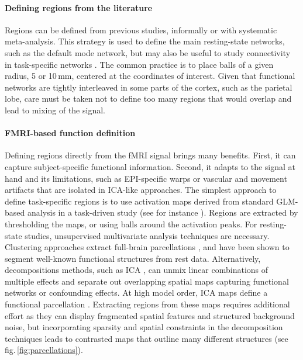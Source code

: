 \documentclass[5p]{elsarticle}
\begin{document}
\paragraph{Defining regions from the literature}
%
Regions can be defined from previous studies, informally or with
systematic meta-analysis. This strategy is used to define the main
resting-state networks, such as the default mode network, but may also be
useful to study connectivity in task-specific networks
\cite{grillon2012}. The common practice is to place balls of a given
radius, 5 or 10\,mm, centered at the coordinates of interest. Given that
functional networks are tightly interleaved in some parts of the cortex,
such as the parietal lobe, care must be taken not to define too many
regions that would overlap and lead to mixing of the signal.

\paragraph{FMRI-based function definition}
%
Defining regions directly from the fMRI signal brings many benefits.
First, it can capture subject-specific functional information. Second, it
adapts to the signal at hand and its limitations, such as
EPI-specific warps or vascular and movement artifacts that are isolated
in ICA-like approaches. The simplest approach to define task-specific
regions is to use activation maps derived from standard GLM-based
analysis in a task-driven study (see for instance \cite{poldrack2011}).
Regions are extracted by thresholding the maps, or using balls around the
activation peaks. For resting-state studies, unsupervised multivariate
analysis techniques are necessary. Clustering approaches extract
full-brain parcellations \cite{craddock2011, bellec2010, yeo2011,
thirion2006}, and have been shown to segment well-known functional
structures from rest data. Alternatively, decompositions
methods, such as ICA \cite{beckmann2004}, can unmix linear
combinations of multiple effects and separate out overlapping spatial maps
capturing functional networks or confounding effects. At high model
order, ICA maps define a functional parcellation \cite{kiviniemi2009}.
Extracting regions from these maps requires additional effort as they can
display fragmented spatial features and structured background noise, but
incorporating sparsity and spatial constraints in the decomposition
techniques leads to contrasted maps that outline many different
structures \cite{varoquaux2012} (see fig.\,\ref{fig:parcellations}).
\end{document}
